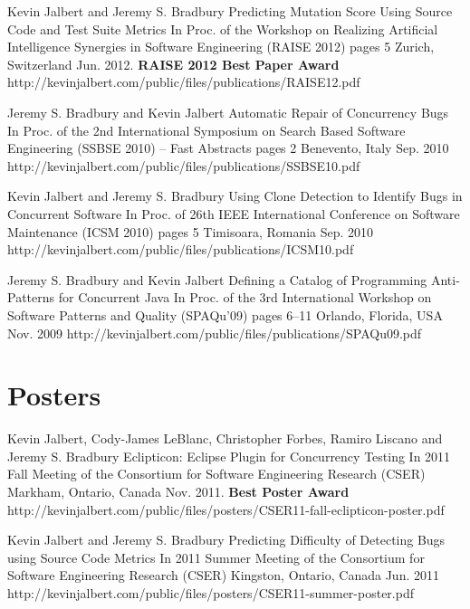   \publicationEntry
    {Kevin Jalbert and Jeremy S. Bradbury}
    {Predicting Mutation Score Using Source Code and Test Suite Metrics}
    {In Proc. of the Workshop on Realizing Artificial Intelligence Synergies in Software Engineering (RAISE 2012)}
    {pages 5}
    {Zurich, Switzerland}
    {Jun. 2012. \textbf{RAISE 2012 Best Paper Award}}
    {http://kevinjalbert.com/public/files/publications/RAISE12.pdf}

  \publicationEntry
    {Jeremy S. Bradbury and Kevin Jalbert}
    {Automatic Repair of Concurrency Bugs}
    {In Proc. of the 2nd International Symposium on Search Based Software Engineering (SSBSE 2010) -- Fast Abstracts}
    {pages 2}
    {Benevento, Italy}
    {Sep. 2010}
    {http://kevinjalbert.com/public/files/publications/SSBSE10.pdf}

  \publicationEntry
    {Kevin Jalbert and Jeremy S. Bradbury}
    {Using Clone Detection to Identify Bugs in Concurrent Software}
    {In Proc. of 26th IEEE International Conference on Software Maintenance (ICSM 2010)}
    {pages 5}
    {Timisoara, Romania}
    {Sep. 2010}
    {http://kevinjalbert.com/public/files/publications/ICSM10.pdf}

  \publicationEntry
    {Jeremy S. Bradbury and Kevin Jalbert}
    {Defining a Catalog of Programming Anti-Patterns for Concurrent Java}
    {In Proc. of the 3rd International Workshop on Software Patterns and Quality (SPAQu'09)}
    {pages 6--11}
    {Orlando, Florida, USA}
    {Nov. 2009}
    {http://kevinjalbert.com/public/files/publications/SPAQu09.pdf}

  \section{Posters}

  \posterEntry
    {Kevin Jalbert, Cody-James LeBlanc, Christopher Forbes, Ramiro Liscano and Jeremy S. Bradbury}
    {Eclipticon: Eclipse Plugin for Concurrency Testing}
    {In 2011 Fall Meeting of the Consortium for Software Engineering Research (CSER)}
    {Markham, Ontario, Canada}
    {Nov. 2011. \textbf{Best Poster Award}}
    {http://kevinjalbert.com/public/files/posters/CSER11-fall-eclipticon-poster.pdf}

  \posterEntry
    {Kevin Jalbert and Jeremy S. Bradbury}
    {Predicting Difficulty of Detecting Bugs using Source Code Metrics}
    {In 2011 Summer Meeting of the Consortium for Software Engineering Research (CSER)}
    {Kingston, Ontario, Canada}
    {Jun. 2011}
    {http://kevinjalbert.com/public/files/posters/CSER11-summer-poster.pdf}


